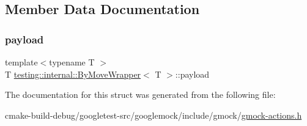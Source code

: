\subsection{Member Data Documentation}
\mbox{\label{structtesting_1_1internal_1_1ByMoveWrapper_ae8407b1ae99db3f00797d68b9ee9e870}} 
\subsubsection{\texorpdfstring{payload}{payload}}
{\footnotesize\ttfamily template$<$typename T $>$ \\
T \mbox{\hyperlink{structtesting_1_1internal_1_1ByMoveWrapper}{testing\+::internal\+::\+By\+Move\+Wrapper}}$<$ T $>$\+::payload}



The documentation for this struct was generated from the following file\+:\begin{DoxyCompactItemize}
\item 
cmake-\/build-\/debug/googletest-\/src/googlemock/include/gmock/\mbox{\hyperlink{gmock-actions_8h}{gmock-\/actions.\+h}}\end{DoxyCompactItemize}
